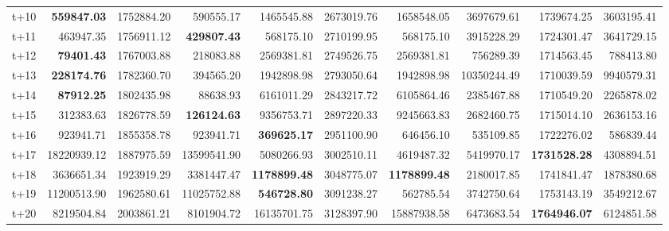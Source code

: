 \begin{table}[H]
\begin{tabular}{lrrrrrrrrr}
t+10  & \textbf{559847.03}  & 1752884.20  & 590555.17  & 1465545.88  & 2673019.76  & 1658548.05  & 3697679.61  & 1739674.25  & 3603195.41  \\
t+11  & 463947.35  & 1756911.12  & \textbf{429807.43}  & 568175.10  & 2710199.95  & 568175.10  & 3915228.29  & 1724301.47  & 3641729.15  \\
t+12  & \textbf{79401.43}  & 1767003.88  & 218083.88  & 2569381.81  & 2749526.75  & 2569381.81  & 756289.39  & 1714563.45  & 788413.80  \\
t+13  & \textbf{228174.76}  & 1782360.70  & 394565.20  & 1942898.98  & 2793050.64  & 1942898.98  & 10350244.49  & 1710039.59  & 9940579.31  \\
t+14  & \textbf{87912.25}  & 1802435.98  & 88638.93  & 6161011.29  & 2843217.72  & 6105864.46  & 2385467.88  & 1710549.20  & 2265878.02  \\
t+15  & 312383.63  & 1826778.59  & \textbf{126124.63}  & 9356753.71  & 2897220.33  & 9245663.83  & 2682460.75  & 1715014.10  & 2636153.16  \\
t+16  & 923941.71  & 1855358.78  & 923941.71  & \textbf{369625.17}  & 2951100.90  & 646456.10  & 535109.85  & 1722276.02  & 586839.44  \\
t+17  & 18220939.12  & 1887975.59  & 13599541.90  & 5080266.93  & 3002510.11  & 4619487.32  & 5419970.17  & \textbf{1731528.28}  & 4308894.51  \\
t+18  & 3636651.34  & 1923919.29  & 3381447.47  & \textbf{1178899.48}  & 3048775.07  & \textbf{1178899.48}  & 2180017.85  & 1741841.47  & 1878380.68  \\
t+19  & 11200513.90  & 1962580.61  & 11025752.88  & \textbf{546728.80}  & 3091238.27  & 562785.54  & 3742750.64  & 1753143.19  & 3549212.67  \\
t+20  & 8219504.84  & 2003861.21  & 8101904.72  & 16135701.75  & 3128397.90  & 15887938.58  & 6473683.54  & \textbf{1764946.07}  & 6124851.58  \\

\bottomrule
\end{tabular}
\end{table}
